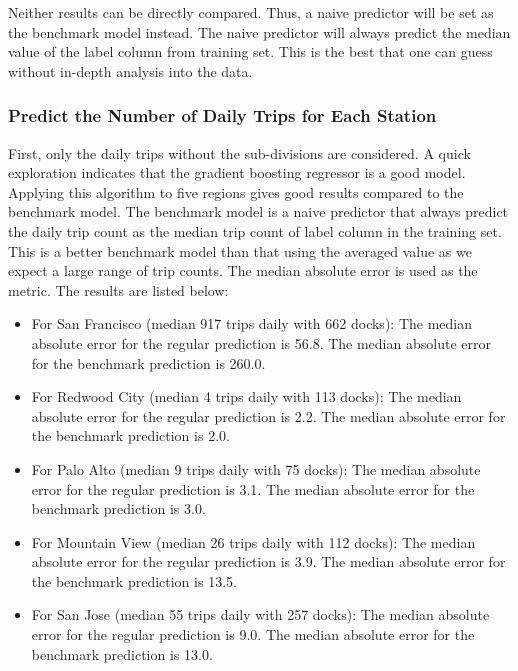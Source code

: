 \documentclass[a4paper]{article}
\begin{document}
			Neither results can be directly compared. Thus, a naive predictor will be set as the benchmark model instead. The naive predictor will always predict the median value of the label column from training set. This is the best that one can guess without in-depth analysis into the data.
			
			\subsubsection{Predict the Number of Daily Trips for Each Station}
			First, only the daily trips without the sub-divisions are considered. A quick exploration indicates that the gradient boosting regressor is a good model. Applying this algorithm to five regions gives good results compared to the benchmark model. The benchmark model is a naive predictor that always predict the daily trip count as the median trip count of label column in the training set. This is a better benchmark model than that using the averaged value as we expect a large range of trip counts. The median absolute error is used as the metric. The results are listed below:
			
			\begin{itemize}
				\item For San Francisco (median 917 trips daily with 662 docks):
				The median absolute error for the regular prediction is 56.8.
				The median absolute error for the benchmark prediction is 260.0. 
				
				\item For Redwood City (median 4 trips daily with 113 docks):
				The median absolute error for the regular prediction is 2.2.
				The median absolute error for the benchmark prediction is 2.0. 
				
				\item For Palo Alto (median 9 trips daily with 75 docks):
				The median absolute error for the regular prediction is 3.1.
				The median absolute error for the benchmark prediction is 3.0. 
				
				\item For Mountain View (median 26 trips daily with 112 docks):
				The median absolute error for the regular prediction is 3.9.
				The median absolute error for the benchmark prediction is 13.5. 
				
				\item For San Jose (median 55 trips daily with 257 docks):
				The median absolute error for the regular prediction is 9.0.
				The median absolute error for the benchmark prediction is 13.0. 
			\end{itemize}
			
\end{document}
